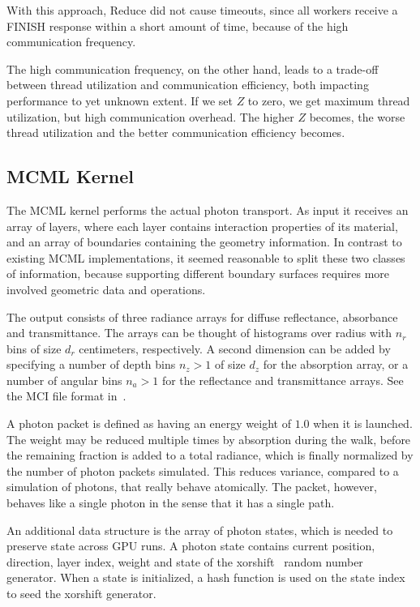 \documentclass[]{article}
\begin{document}
With this approach, Reduce did not cause timeouts, since all workers receive a FINISH response within a short amount of time, because of the high communication frequency.

The high communication frequency, on the other hand, leads to a trade-off between thread utilization and communication efficiency, both impacting performance to yet unknown extent. If we set $Z$ to zero, we get maximum thread utilization, but high communication overhead. The higher $Z$ becomes, the worse thread utilization and the better communication efficiency becomes.

\subsection{MCML Kernel}
\label{impl:photon-transport}

The MCML kernel performs the actual photon transport. As input it receives an array of layers, where each layer contains interaction properties of its material, and an array of boundaries containing the geometry information. In contrast to existing MCML implementations, it seemed reasonable to split these two classes of information, because supporting different boundary surfaces requires more involved geometric data and operations.

The output consists of three radiance arrays for diffuse reflectance, absorbance and transmittance. The arrays can be thought of histograms over radius with $n_r$ bins of size $d_r$ centimeters, respectively. A second dimension can be added by specifying a number of depth bins $n_z > 1$ of size $d_z$ for the absorption array, or a number of angular bins $n_a > 1$ for the reflectance and transmittance arrays. See the MCI file format in~\cite{wang1992monte}.

A photon packet is defined as having an energy weight of $1.0$ when it is launched. The weight may be reduced multiple times by absorption during the walk, before the remaining fraction is added to a total radiance, which is finally normalized by the number of photon packets simulated. This reduces variance, compared to a simulation of photons, that really behave atomically. The packet, however, behaves like a single photon in the sense that it has a single path.

An additional data structure is the array of photon states, which is needed to preserve state across GPU runs. A photon state contains current position, direction, layer index, weight and state of the xorshift~\cite{marsaglia2003xorshift} random number generator. When a state is initialized, a hash function is used on the state index to seed the xorshift generator.
\end{document}
